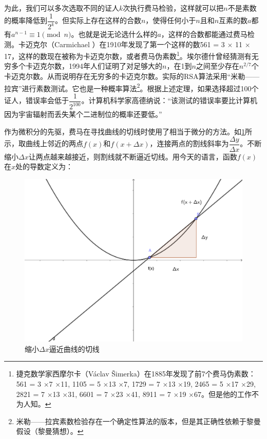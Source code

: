 \documentclass[b5paper]{ctexart}
\begin{document}
为此，我们可以多次选取不同的证人$k$次执行费马检验，这样就可以把$n$不是素数的概率降低到$\dfrac{1}{2^k}$。但实际上存在这样的合数$n$，使得任何小于$n$且和$n$互素的数$a$都有$a^{n-1} \equiv 1 \pmod n$。也就是说无论选什么样的$a$，这样的合数都能通过费马检测。卡迈克尔（Carmichael ）在1910年发现了第一个这样的数561 = 3 $\times$ 11 $\times$ 17，这样的数现在被称为卡迈克尔数，或者费马伪素数\footnote{捷克数学家西摩尔卡（Václav Šimerka）在1885年发现了前7个费马伪素数：561 = 3 $\times$7 $\times$11, 1105 = 5 $\times$13 $\times$7, 1729 = 7 $\times$13 $\times$19, 2465 = 5 $\times$17 $\times$29, 2821 = 7 $\times$13 $\times$31, 6601 = 7 $\times$23 $\times$41, 8911 = 7 $\times$19 $\times$67。但是他的工作不为人知。}。埃尔德什曾经猜测有无穷多个卡迈克尔数，1994年人们证明了对足够大的$n$，在1到$n$之间至少存在$n^{2/7}$个卡迈克尔数。从而说明存在无穷多的卡迈克尔数\cite{Wiki-Carmichael-number}。实际的RSA算法采用“米勒——拉宾”进行素数测试。它也是一种概率算法\footnote{米勒——拉宾素数检验存在一个确定性算法的版本，但是其正确性依赖于黎曼假设（黎曼猜想）\cite{Wiki-Miller-Rabin}。}。根据上述定理，如果选择超过100个证人，错误率会低于$\dfrac{1}{2^{100}}$。计算机科学家高德纳说：“该测试的错误率要比计算机因为宇宙辐射而丢失某个二进制位的概率还要低。”

作为微积分的先驱，费马在寻找曲线的切线时使用了相当于微分的方法。如\cref{fig:tagent}所示，取曲线上邻近的两点$f(x)$和$f(x + \Delta x)$，连接两点的割线斜率为$\dfrac{\Delta y}{\Delta x}$。不断缩小$\Delta x$让两点越来越接近，则割线就不断逼近切线。用今天的语言，函数$f(x)$在$x$处的导数定义为：

\begin{figure}[htbp]
 \centering
 \includegraphics[scale=0.4]{img/tagent}
 \caption{缩小$\Delta x$逼近曲线的切线}
 \label{fig:tagent}
\end{figure}
\end{document}
